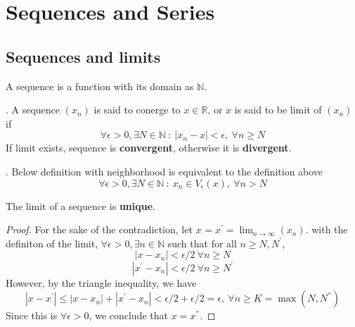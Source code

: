 \chapter{Sequences and Series}
\section{Sequences and limits}
\begin{definition} A sequence is a function with its domain as $\mathbb{N}$.
\end{definition}

\begin{definition}. A sequence $(x_n)$ is said  to conerge to $x \in \mathbb{R}$, or $x$ is said to be limit of $(x_n)$ if
    \[\forall \epsilon > 0,\exists N \in \mathbb{N} \ : \ |x_n - x| < \epsilon, \ \forall n \ge N\]
    If limit exists, sequence is \textbf{convergent}, otherwise it is \textbf{divergent}.
\end{definition}

\begin{definition}. Below definition with neighborhood is equivalent to the definition above
    \[\forall \epsilon > 0, \exists N \in \mathbb{N} \ : \ x_n \in V_{\epsilon}(x), \ \forall n > N\]
\end{definition}

\begin{theorem} The limit of a sequence is \textbf{unique}.
    \begin{proof}
        For the sake of the contradiction, let $x^{} = x^{'} = \lim_{n \rightarrow \infty} (x_n)$.
        with the definiton of the limit, $\forall \epsilon > 0,\exists n \in \mathbb{N}$ such that for all $n \ge N,N^{'}$,
        \[ |x - x_n| < \epsilon /2 \ \forall n \ge N\]
        \[ |x^{'} - x_n| < \epsilon / 2 \ \forall n \ge N^{'}\]
        However, by the triangle inequality, we have
        \[ |x - x^{'}| \le |x- x_n| + |x^{'} - x_n| < \epsilon/2 + \epsilon/2 = \epsilon, \ \forall n \ge K = \max (N, N^{''})\]
    Since this is $\forall \epsilon > 0$, we conclude that $x = x^{''}$.
    \end{proof}
\end{theorem}
